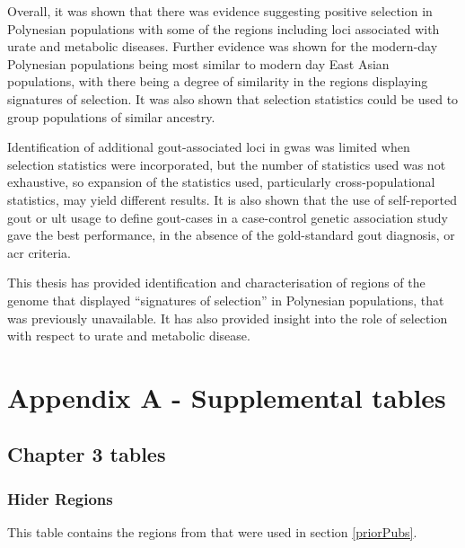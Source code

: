 \documentclass[]{report}
\begin{document}
Overall, it was shown that there was evidence suggesting positive
selection in Polynesian populations with some of the regions including
loci associated with urate and metabolic diseases. Further evidence was
shown for the modern-day Polynesian populations being most similar to
modern day East Asian populations, with there being a degree of
similarity in the regions displaying signatures of selection. It was
also shown that selection statistics could be used to group populations
of similar ancestry.

Identification of additional gout-associated loci in \gls{gwas} was
limited when selection statistics were incorporated, but the number of
statistics used was not exhaustive, so expansion of the statistics used,
particularly cross-populational statistics, may yield different results.
It is also shown that the use of self-reported gout or \gls{ult} usage
to define gout-cases in a case-control genetic association study gave
the best performance, in the absence of the gold-standard gout
diagnosis, or \gls{acr} criteria.

This thesis has provided identification and characterisation of regions
of the genome that displayed ``signatures of selection'' in Polynesian
populations, that was previously unavailable. It has also provided
insight into the role of selection with respect to urate and metabolic
disease.

\chapter{Appendix A - Supplemental
tables}\label{appendix-a---supplemental-tables}

\section{Chapter 3 tables}\label{chapter-3-tables}

\subsection{Hider Regions}\label{hider-regions}

This table contains the regions from \citet{Hider2013} that were used in
section \ref{priorPubs}.
\end{document}
